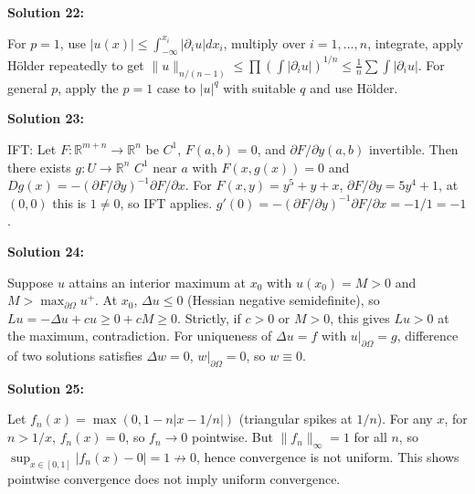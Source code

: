 \documentclass[12pt,a4paper]{exam}
\begin{document}
\vspace{0.5cm}

\textbf{Solution 22:}

For $p=1$, use $|u(x)| \leq \int_{-\infty}^{x_i} |\partial_i u| dx_i$, multiply over $i=1,\ldots,n$, integrate, apply H\"older repeatedly to get $\|u\|_{n/(n-1)} \leq \prod (\int |\partial_i u|)^{1/n} \leq \frac{1}{n} \sum \int |\partial_i u|$. For general $p$, apply the $p=1$ case to $|u|^q$ with suitable $q$ and use H\"older.

\vspace{0.5cm}

\textbf{Solution 23:}

IFT: Let $F: \mathbb{R}^{m+n} \to \mathbb{R}^n$ be $C^1$, $F(a,b)=0$, and $\partial F/\partial y (a,b)$ invertible. Then there exists $g: U \to \mathbb{R}^n$ $C^1$ near $a$ with $F(x,g(x))=0$ and $Dg(x) = -(\partial F/\partial y)^{-1} \partial F/\partial x$. For $F(x,y) = y^5 + y + x$, $\partial F/\partial y = 5y^4 + 1$, at $(0,0)$ this is $1 \neq 0$, so IFT applies. $g'(0) = - (\partial F/\partial y)^{-1} \partial F/\partial x = -1/1 = -1$.

\vspace{0.5cm}

\textbf{Solution 24:}

Suppose $u$ attains an interior maximum at $x_0$ with $u(x_0) = M > 0$ and $M > \max_{\partial\Omega} u^+$. At $x_0$, $\Delta u \leq 0$ (Hessian negative semidefinite), so $Lu = -\Delta u + c u \geq 0 + cM \geq 0$. Strictly, if $c>0$ or $M>0$, this gives $Lu > 0$ at the maximum, contradiction. For uniqueness of $\Delta u = f$ with $u|_{\partial\Omega} = g$, difference of two solutions satisfies $\Delta w = 0$, $w|_{\partial\Omega} = 0$, so $w \equiv 0$.

\vspace{0.5cm}

\textbf{Solution 25:}

Let $f_n(x) = \max(0, 1 - n|x - 1/n|)$ (triangular spikes at $1/n$). For any $x$, for $n > 1/x$, $f_n(x) = 0$, so $f_n \to 0$ pointwise. But $\|f_n\|_\infty = 1$ for all $n$, so $\sup_{x \in [0,1]} |f_n(x) - 0| = 1 \not\to 0$, hence convergence is not uniform. This shows pointwise convergence does not imply uniform convergence.

\vspace{0.5cm}
\end{document}
